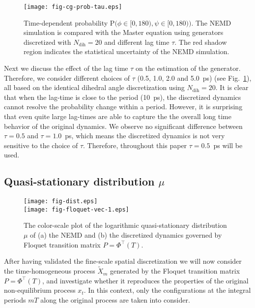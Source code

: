 \documentclass[journal=jctcce,manuscript=article]{achemso}
\newcommand{\vect}[1]{#1}
\newcommand{\myphi}{\Phi}
\newcommand{\mymu}{\mu}
\newcommand{\prob}{\textrm{P}}
\newcommand{\dih}{\textrm{dih}}
\begin{document}
\begin{figure}
  \centering
  \texttt{[image: fig-cg-prob-tau.eps]}  
  \caption{Time-dependent probability $\prob\big(\phi\in[0,180), \psi\in [0,180)\big)$.  The NEMD simulation is compared with the Master equation using generators discretized with $N_\dih=20$ and different lag time $\tau$. The red shadow region indicates the
    statistical uncertainty of the NEMD simulation.}
  \label{fig:tmp3}
\end{figure}

Next we discuss the effect of the lag time $\tau$ on the estimation of the generator. Therefore, we consider 
different choices of $\tau$ (0.5, 1.0, 2.0 and 5.0~ps)
(see Fig.~\ref{fig:tmp3}), all based on the identical dihedral angle discretization using $N_\dih=20$.
It is clear that when the lag-time is close to the period (10~ps), the
discretized dynamics cannot resolve the probability change within a
period. However, it is surprising  that even quite large lag-times are able to capture the
the overall long time behavior of the original dynamics.
We observe no significant difference between $\tau=0.5$ and
$\tau=1.0$~ps, which means the discretized dynamics is not very sensitive
to the choice of $\tau$.
Therefore, throughout this paper $\tau=0.5$~ps will be used.



\subsection{Quasi-stationary distribution $\mymu$}


\begin{figure}
  \centering  
  \texttt{[image: fig-dist.eps]}\\
  \texttt{[image: fig-floquet-vec-1.eps]}
  \caption{The color-scale plot of the logarithmic quasi-stationary distribution $\mymu$
    of (a) the NEMD  and (b)
    the discretized dynamics governed by Floquet transition matrix $\vect P=\myphi^{\top}(T)$.
  }
  \label{fig:num-1}
\end{figure}

After having validated the fine-scale spatial discretization 
we will now consider the time-homogeneous process $\tilde X_{m}$ generated by
the Floquet transition matrix $P = \Phi^{\top}(T)$, and investigate whether it
reproduces the properties of the original  non-equilibrium process $x_t$.
In this context, only the configurations at the  integral periods $mT$ along the original process
are taken into consider.
\end{document}

